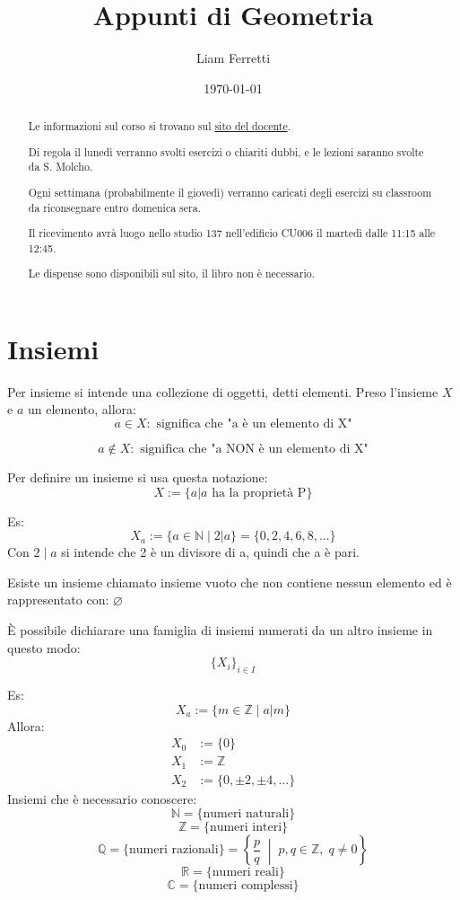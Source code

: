 \documentclass[a4paper,12pt]{article}
\title{Appunti di Geometria}
\author{Liam Ferretti}
\date{\today}
\begin{document}
	
	\maketitle
	
	\begin{abstract}
		Le informazioni sul corso si trovano sul \hyperlink{https://sites.google.com/uniroma1.it/kieranogrady}{sito del docente}.
		
		Di regola il lunedì verranno svolti esercizi o chiariti dubbi, e le lezioni saranno svolte da S. Molcho.
		
		Ogni settimana (probabilmente il giovedì) verranno caricati degli esercizi su classroom da riconsegnare entro domenica sera.
		
		Il ricevimento avrà luogo nello studio 137 nell'edificio CU006 il martedì dalle 11:15 alle 12:45.
		
		Le dispense sono disponibili sul sito, il libro non è necessario.
	\end{abstract}
		
	\tableofcontents
	\clearpage
	
	\section{Insiemi}
	Per insieme si intende una collezione di oggetti, detti elementi.
	Preso l'insieme $X$ e $a$ un elemento, allora:
	\[
	a \in X: \text{ significa che "a è un elemento di X"}
	\]
	
	\[
	a \not \in X: \text{ significa che "a NON è un elemento di X"}
	\]
	
	Per definire un insieme si usa questa notazione:
	\[
	X := \{a | a \text{ ha la proprietà P}\}
	\]
	
	Es: 
	\[
		X_a := \{a \in \mathbb{N} \mid 2 | a\} = \{0, 2, 4, 6, 8, ...\}
	\]
	Con $2 \mid a$ si intende che 2 è un divisore di a, quindi che a è pari.\newline
	
	Esiste un insieme chiamato insieme vuoto che non contiene nessun elemento ed è rappresentato con: $\varnothing$ \newline
	
	È possibile dichiarare una famiglia di insiemi numerati da un altro insieme in questo modo:
	\[
	\{X_i\}_{i \in I}
	\]
	
	Es: 
	\[
	X_a := \{m \in \mathbb{Z} \mid a | m\}
	\]
	Allora:
	\begin{align*}
		X_0 &:= \{0\} \\
		X_1 &:= \mathbb{Z} \\
		X_2 &:= \{0, \pm 2, \pm 4, ...\}
	\end{align*}
	\newline	
	Insiemi che è necessario conoscere:
	\[
		\mathbb{N} = \{ \text{numeri naturali} \}
	\]
	\[
		\mathbb{Z} = \{ \text{numeri interi} \}
	\]
	\[
		\mathbb{Q} = \{ \text{numeri razionali} \} = \left\{ \frac{p}{q} \;\middle|\; p,q \in \mathbb{Z}, \; q \neq 0 \right\}
	\]
	\[
		\mathbb{R} = \{ \text{numeri reali} \}
	\]
	\[
		\mathbb{C} = \{ \text{numeri complessi} \}
	\]
	
\end{document}
